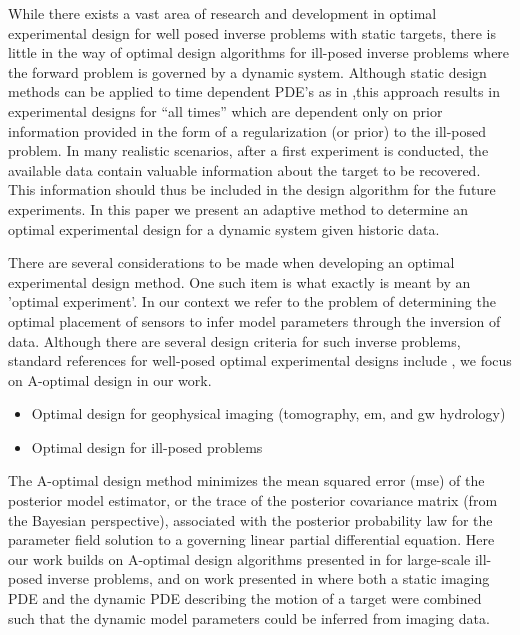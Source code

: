 \documentclass[11pt]{article}
\begin{document}
 While there exists a vast area of research and development in optimal experimental design for well posed inverse problems with static targets, there is little in the way of optimal design algorithms for ill-posed inverse problems where the forward problem is governed by a dynamic system. Although static design methods can be applied to time dependent PDE's as in \cite{Alexanderian2014},this approach results in experimental designs for ``all times'' which are dependent only on prior information provided in the form of a regularization (or prior) to the ill-posed problem.
 In many realistic scenarios, after a first experiment is conducted, the available data contain valuable information about the target to be recovered. This information should thus be included in the design algorithm for the future experiments. In this paper we present an adaptive method to determine an optimal experimental design for a dynamic system given historic data.
 
There are several considerations to be made when developing an optimal experimental design method. One such item is what exactly is meant by an 'optimal experiment'. In our context we refer to the problem of determining  the optimal placement of sensors to infer model parameters  through the inversion of  data. 
 Although there are several design criteria for such inverse problems, standard references for well-posed optimal experimental designs include \cite{Fedorov1972,Atkinson1992,Banks2011,Verdinelli2013}, we focus on A-optimal design in our work. 
 \begin{itemize}
 
\item Optimal design for geophysical imaging (tomography, em, and gw hydrology) \cite{Curtis1999,Ajo-Franklin2009,Coles2009a,Hus1989,Maurer2000,Wilkinson2012} 

\item Optimal design for ill-posed problems \cite{Bardow2008,Haber2008,Lucero2013}
 \end{itemize}
 The A-optimal design method minimizes the mean squared error (mse) of the posterior model estimator, or the trace of the posterior covariance matrix (from the Bayesian perspective), associated with the posterior probability law for the parameter field solution to a governing linear partial differential equation. Here our work builds on A-optimal design algorithms presented in \cite{Haber2011} for large-scale ill-posed inverse problems, and on work presented in \cite{Fohring2014} where both a static imaging PDE and the dynamic PDE describing the motion of a target were combined such that the dynamic model parameters could be inferred from imaging data. 
\end{document}
